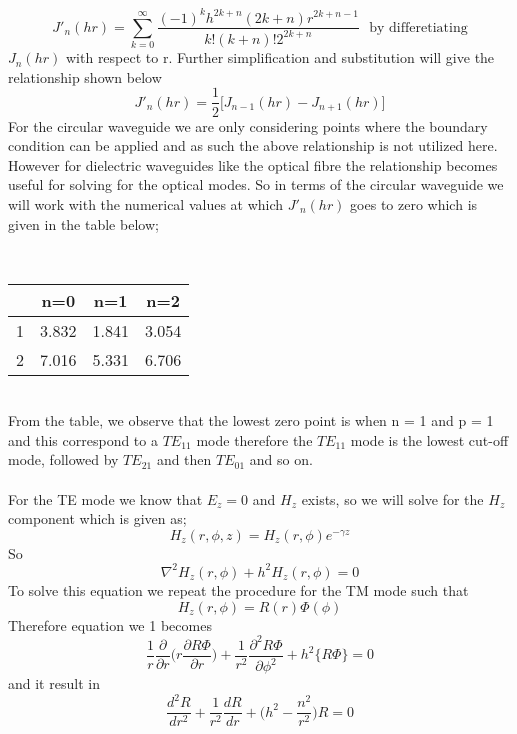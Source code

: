       $$J'_n(hr) = \sum_{k = 0}^{\infty}\dfrac{(-1)^k h^{2k + n}(2k + n)r^{2k + n -1}}{k!(k+n)!2^{2k + n}} \ \ \ \text{by differetiating}$$		
      $J_n(hr)$ with respect to r. Further simplification and substitution will give the relationship shown below 
      $$ J'_n(hr) = \frac{1}{2}\bigg[J_{n-1}(hr) - J_{n + 1}(hr)\bigg] $$
      For the circular waveguide we are only considering points where the boundary condition can be applied and as such the above relationship is not utilized here. However for dielectric waveguides like the optical fibre the relationship becomes useful for solving for the optical modes. So in terms of the circular waveguide we will work with the numerical values at which $J'_n(hr)$ goes to zero which is given in the table below;\\
      \begin{table}[h!]
      	\centering
      	\\
      	\begin{tabular}{|c | c  c  c|}
      		\hline
      		\backslashbox{p}{n} & n=0 & n=1 & n=2 \\
      		\hline
      		1 & 3.832 & 1.841 & 3.054 \\
      		2 & 7.016 & 5.331 &6.706 \\
      		\hline
      	\end{tabular}
      \end{table}
      \\
      From the table, we observe that the lowest zero point is when n = 1 and p = 1 and this correspond to a $TE_{11}$ mode therefore the $TE_{11}$ mode is the lowest cut-off mode, followed by $TE_{21}$ and then $TE_{01}$ and so on.\\\\
      For the TE mode we know that $E_z = 0$ and $H_z$ exists, so we will solve for the $H_z$   component which is given as;
      $$H_z(r,\phi,z) = H_z(r,\phi)e^{-\gamma z}$$ So \begin{equation} \nabla^2 H_z(r,\phi) +  h^2 H_z(r,\phi) = 0\end{equation}
      To solve this equation we repeat the procedure for the TM mode such that 
      $$H_z(r,\phi)= R(r)\Phi(\phi)$$
      Therefore equation we 1 becomes
      $$ \frac{1}{r}\frac{\partial}{\partial r}\bigg(r\frac{\partial R\Phi}{\partial r}\bigg) + \frac{1}{r^2}\frac{\partial^2 R\Phi}{\partial \phi^2} + h^2\{R\Phi\} = 0$$
      and it result in
      \begin{equation}
      \dfrac{d^2 R}{dr^2} + \frac{1}{r^2}\dfrac{dR}{dr} + \bigg(h^2 - \frac{n^2}{r^2}\bigg)R = 0
      \end{equation}
